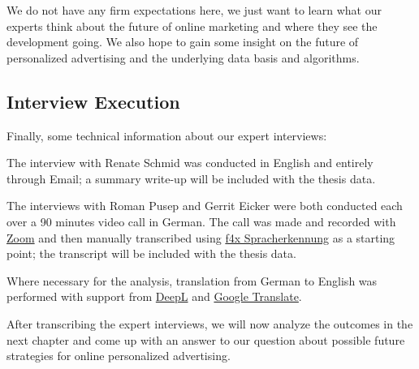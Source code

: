 We do not have any firm expectations here, we just want to learn what our experts think about the future of online marketing and where they see the development going. We also hope to gain some insight on the future of personalized advertising and the underlying data basis and algorithms.

\subsection{Interview Execution}

Finally, some technical information about our expert interviews:

The interview with Renate Schmid was conducted in English and entirely through Email; a summary write-up will be included with the thesis data.

The interviews with Roman Pusep and Gerrit Eicker were both conducted each over a 90 minutes video call in German. The call was made and recorded with \href{https://zoom.us/}{Zoom} and then manually transcribed using \href{https://f4x.audiotranskription.de/}{f4x Spracherkennung} as a starting point; the transcript will be included with the thesis data.

Where necessary for the analysis, translation from German to English was performed with support from \href{https://www.deepl.com/en/translator}{DeepL} and \href{https://translate.google.de/}{Google Translate}.

After transcribing the expert interviews, we will now analyze the outcomes in the next chapter and come up with an answer to our question about possible future strategies for online personalized advertising.
